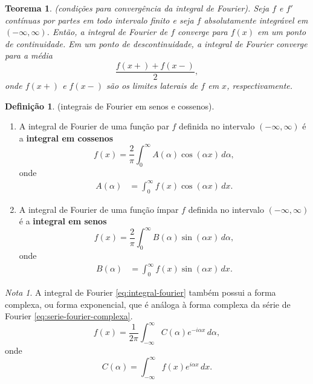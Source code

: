 \documentclass{article}
\theoremstyle{plain}
\newtheorem{thm}{Teorema}[section]
\theoremstyle{definition}
\newtheorem{defn}{Definição}[section]
\theoremstyle{remark}
\newtheorem*{rem}{Nota}
\begin{document}
\begin{thm} (condições para convergência da integral de Fourier).
    Seja \(f\) e \(f'\) contínuas por partes em todo intervalo finito e seja \(f\) absolutamente integrável em \((-\infty, \infty)\). Então, a integral de Fourier de \(f\) converge para \(f(x)\) em um ponto de continuidade. Em um ponto de descontinuidade, a integral de Fourier converge para a média
    \begin{equation}
        \frac{f(x+) + f(x-)}{2},
    \end{equation}
    \noindent onde \(f(x+)\) e \(f(x-)\) são os limites laterais de \(f\) em \(x\), respectivamente.
\end{thm}

\begin{defn} (integrais de Fourier em senos e cossenos).
    \begin{enumerate}
        \item[(i)] A integral de Fourier de uma função par \(f\) definida no intervalo \(\left(-\infty, \infty\right)\) é a \textbf{integral em cossenos}
        \begin{equation}
            f(x) = \frac{2}{\pi} \int_{0}^{\infty} A(\alpha) \cos(\alpha x) \, d\alpha,
        \end{equation}
        \noindent onde
        \begin{align}
            A(\alpha) &= \int_{0}^{\infty} f(x) \cos(\alpha x) \, dx.
        \end{align}
        \item[(ii)] A integral de Fourier de uma função ímpar \(f\) definida no intervalo \(\left(-\infty, \infty\right)\) é a \textbf{integral em senos}
        \begin{equation}
            f(x) = \frac{2}{\pi} \int_{0}^{\infty} B(\alpha) \sin(\alpha x) \, d\alpha,
        \end{equation}
        \noindent onde
        \begin{align}
            B(\alpha) &= \int_{0}^{\infty} f(x) \sin(\alpha x) \, dx.
        \end{align}
    \end{enumerate}
\end{defn}

\begin{rem}
    A integral de Fourier \eqref{eq:integral-fourier} também possui a forma complexa, ou forma exponencial, que é análoga à forma complexa da série de Fourier \eqref{eq:serie-fourier-complexa}.
    \begin{equation}\label{eq:integral-fourier-complexa}
        f(x) = \frac{1}{2\pi} \int_{-\infty}^{\infty} C(\alpha) e^{-i\alpha x} \, d\alpha,
    \end{equation}
    \noindent onde
    \begin{equation}
        C(\alpha) = \int_{-\infty}^{\infty} f(x) e^{i\alpha x} \, dx.
    \end{equation}
\end{rem}
\end{document}
